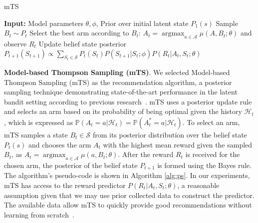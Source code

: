 \documentclass{article}
\newcommand{\argmax}{\mathop{\mathrm{argmax}}}
\begin{document}



\begin{algorithm}[!b]
\caption{mTS~\citep{Hong2020}}
\label{alg:ps}
\begin{algorithmic}[1]
\State \textbf{Input:} 
\State \;\;\;\; Model parameters $\theta, \phi$, 
\State \;\;\;\; Prior over initial latent state $P_1(s)$
    \State Sample $B_t \sim P_t$
    \State Select the best arm according to $B_t$: $A_t = \argmax_{a \in \mathcal{A}}  \mu(A, B_t; \theta)$ and observe $R_t$ 
    \State Update belief state posterior $P_{t+1}(S_{t+1}) \propto \sum_{S_t \in \mathcal{S}} P_t(S_t)P(S_{t+1} | S_t;\phi) P(R_t | A_t, S_t;\theta)$
\EndFor
\end{algorithmic}
\end{algorithm}

\textbf{Model-based Thompson Sampling (mTS)}.
We selected Model-based Thompson Sampling (mTS) as the recommendation algorithm, a posterior sampling technique demonstrating state-of-the-art performance in the latent bandit setting according to previous research~\citep{Galozy2023, Hong2020}. mTS uses a posterior update rule and selects an arm based on its probability of being optimal given the history $\mathcal{H}_t$, which is expressed as $\mathbb{P}(A_t = a | \mathcal{H}_t) = \mathbb{P}(A^*_t = a | \mathcal{H}_t)$. To select an arm, mTS samples a state $B_t \in \mathcal{S}$ from its posterior distribution over the belief state $P_t(s)$ and chooses the arm $A_t$ with the highest mean reward given the sampled $B_t$, as $A_t = \argmax_{a \in \mathcal{A}} \mu(a, B_t;\theta)$. After the reward $R_t$ is received for the chosen arm, the posterior of the belief state $P_{t+1}$ is formed using the Bayes rule. The algorithm's pseudo-code is shown in Algorithm \ref{alg:ps}. In our experiments, mTS has access to the reward predictor $P(R_t|A_t, S_t; \theta)$, a reasonable assumption given that we may use prior collected data to construct the predictor. The available data allow mTS to quickly provide good recommendations without learning from scratch~\citep{Hong2020}.  
\end{document}
